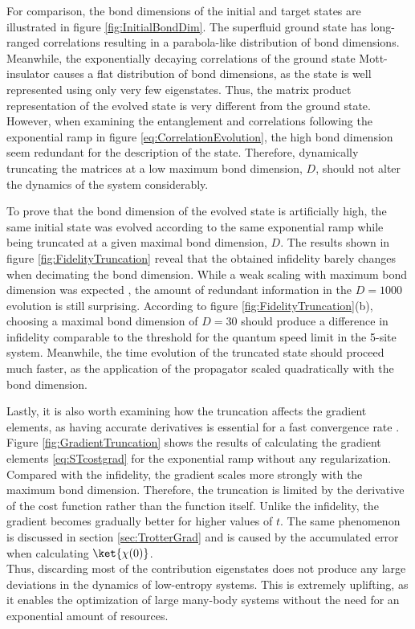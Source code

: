 For comparison, the bond dimensions of the initial and target states are illustrated in figure \ref{fig:InitialBondDim}. The superfluid ground state has long-ranged correlations resulting in a parabola-like distribution of bond dimensions. Meanwhile, the exponentially decaying correlations of the ground state Mott-insulator causes a flat distribution of bond dimensions, as the state is well represented using only very few eigenstates. Thus, the matrix product representation of the evolved state is very different from the ground state. However, when examining the entanglement and correlations following the exponential ramp in figure \ref{eq:CorrelationEvolution}, the high bond dimension seem redundant for the description of the state. Therefore, dynamically truncating the matrices at a low maximum bond dimension, $D$, should not alter the dynamics of the system considerably.

To prove that the bond dimension of the evolved state is artificially high, the same initial state was evolved according to the same exponential ramp while being truncated at a given maximal bond dimension, $D$. The results shown in figure \ref{fig:FidelityTruncation} reveal that the obtained infidelity barely changes when decimating the bond dimension. While a weak scaling with maximum bond dimension was expected \cite{Daley2004}, the amount of redundant information in the $D = 1000$ evolution is still surprising. According to figure \ref{fig:FidelityTruncation}(b), choosing a maximal bond dimension of $D = 30$ should produce a difference in infidelity comparable to the threshold for the quantum speed limit in the 5-site system. Meanwhile, the time evolution of the truncated state should proceed much faster, as the application of the propagator scaled quadratically with the bond dimension.

Lastly, it is also worth examining how the truncation affects the gradient elements, as having accurate derivatives is essential for a fast convergence rate \cite{deFouquieres2011}. Figure \ref{fig:GradientTruncation} shows the results of calculating the gradient elements \eqref{eq:STcostgrad} for the exponential ramp without any regularization. Compared with the infidelity, the gradient scales more strongly with the maximum bond dimension. Therefore, the truncation is limited by the derivative of the cost function rather than the function itself. Unlike the infidelity, the gradient becomes gradually better for higher values of $t$. The same phenomenon is discussed in section \ref{sec:TrotterGrad} and is caused by the accumulated error when calculating $\ket{\chi (0)}$.\\

Thus, discarding most of the contribution eigenstates does not produce any large deviations in the dynamics of low-entropy systems. This is extremely uplifting, as it enables the optimization of large many-body systems without the need for an exponential amount of resources.